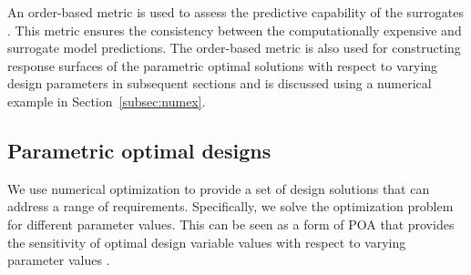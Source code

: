 An order-based metric is used to assess the predictive capability of the surrogates \cite{Audet2018}. This metric ensures the consistency between the computationally expensive and surrogate model predictions. The order-based metric is also used for constructing response surfaces of the parametric optimal solutions with respect to varying design parameters in subsequent sections and is discussed using a numerical example in Section~\ref{subsec:numex}.
%
%

\subsection{Parametric optimal designs} \label{subsec:SBDparametric}

We use numerical optimization to provide a set of design solutions that can address  a range of requirements. Specifically, we solve the optimization problem for different parameter values. This can be seen as a form of \ac{POA} that provides the sensitivity of optimal design variable values with respect to varying parameter values \cite{Sobieszczanski-Sobieski1982}.

